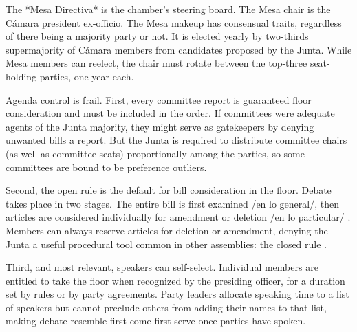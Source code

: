 \documentclass[letter,12pt]{article}
\begin{document}
The *Mesa Directiva* is the chamber's steering board. The Mesa chair is the Cámara president ex-officio. The Mesa makeup has consensual traits, regardless of there being a majority party or not. It is elected yearly by two-thirds supermajority of Cámara members from candidates proposed by the Junta. While Mesa members can reelect, the chair must rotate between the top-three seat-holding parties, one year each. 



Agenda control is frail. First, every committee report is guaranteed floor consideration and must be included in the order. If committees were adequate agents of the Junta majority, they might serve as gatekeepers by denying unwanted bills a report. But the Junta is required to distribute committee chairs (as well as committee seats) proportionally among the parties, so some committees are bound to be preference outliers.

Second, the open rule is the default for bill consideration in the floor. Debate takes place in two stages. The entire bill is first examined /en lo general/, then articles are considered individually for amendment or deletion /en lo particular/ \citep[see][]{heller.weldon.nd}. Members can always reserve articles for deletion or amendment, denying the Junta a useful procedural tool common in other assemblies: the closed rule \citep[eg.,][]{cox.2006,weingast.1992,magar-palanza-sin-Pdt-fast-track-chile-2021jop}.

Third, and most relevant, speakers can self-select. Individual members are entitled to take the floor when recognized by the presiding officer, for a duration set by rules or by party agreements. Party leaders allocate speaking time to a list of speakers but cannot preclude others from adding their names to that list, making debate resemble first-come-first-serve once parties have spoken. 
\end{document}
